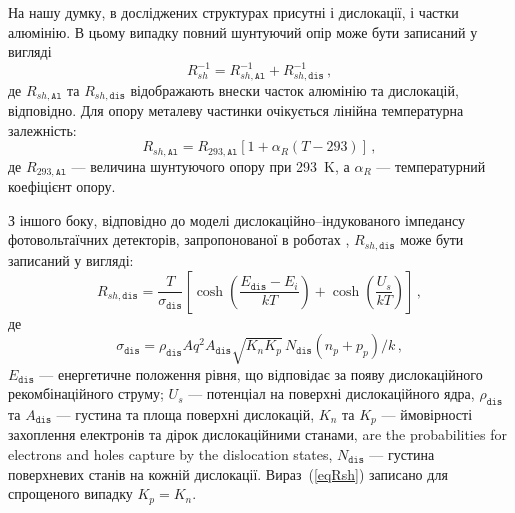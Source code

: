 На нашу думку, в досліджених структурах присутні і дислокації, і частки алюмінію.
В цьому випадку повний шунтуючий опір може бути записаний у вигляді
\begin{equation}
\label{eqRshFull}
R_{sh}^{-1}=R_{sh,\mathtt{Al}}^{-1}+R_{sh,\mathtt{dis}}^{-1}\,,
\end{equation}
де
$R_{sh,\mathtt{Al}}$ та $R_{sh,\mathtt{dis}}$ відображають внески часток алюмінію та дислокацій, відповідно.
Для опору металеву частинки очікується лінійна температурна залежність:
\begin{equation}
\label{eqRshAl}
R_{sh,\mathtt{Al}}=R_{293,\mathtt{Al}}[1+\alpha_R(T-293)]\,,
\end{equation}
де
$R_{293,\mathtt{Al}}$ --- величина шунтуючого опору при 293~K,
а
$\alpha_R$ --- температурний коефіцієнт опору.

З іншого боку, відповідно до моделі дислокаційно--індукованого імпедансу фотовольтаїчних детекторів,
запропонованої в роботах \cite{Rsh:Gopal2003,Rsh:Gopal2004},
$R_{sh,\mathtt{dis}}$ може бути записаний у вигляді:
\begin{equation}
\label{eqRsh}
R_{sh,\mathtt{dis}}=\frac{T}{\sigma_{\mathtt{dis}}}\left[\cosh\left(\frac{E_\mathtt{dis}-E_i}{kT}\right)+\cosh\left(\frac{U_s}{kT}\right)\right]\,,
\end{equation}
де
\begin{equation}
\label{eqRdis}
\sigma_{\mathtt{dis}}=\rho_{\mathtt{dis}}Aq^2A_{\mathtt{dis}}\sqrt{K_nK_p}\,N_{\mathtt{dis}}(n_p+p_p)/k\,,
\end{equation}
$E_{\mathtt{dis}}$ --- енергетичне положення рівня, що відповідає за появу
дислокаційного рекомбінаційного струму;
$U_s$ --- потенціал на поверхні дислокаційного ядра,
$\rho_{\mathtt{dis}}$ та $A_{\mathtt{dis}}$ --- густина та площа поверхні дислокацій,
$K_n$ та $K_p$ --- ймовірності захоплення електронів та дірок дислокаційними станами,
are the probabilities for electrons and holes capture by the dislocation states,
$N_{\mathtt{dis}}$ --- густина поверхневих станів на кожній дислокації.
Вираз~(\ref{eqRsh}) записано для спрощеного випадку $K_p=K_n$.

